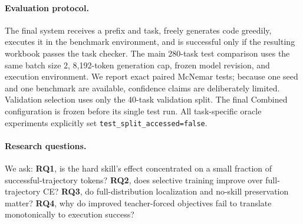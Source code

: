 \paragraph{Evaluation protocol.}
The final system receives a prefix and task, freely generates code greedily, executes it in the benchmark environment, and is successful only if the resulting workbook passes the task checker.  The main 280-task test comparison uses the same batch size 2, 8,192-token generation cap, frozen model revision, and execution environment.  We report exact paired McNemar tests; because one seed and one benchmark are available, confidence claims are deliberately limited.  Validation selection uses only the 40-task validation split.  The final Combined configuration is frozen before its single test run.  All task-specific oracle experiments explicitly set \texttt{test\_split\_accessed=false}.

\paragraph{Research questions.}
We ask: \textbf{RQ1}, is the hard skill's effect concentrated on a small fraction of successful-trajectory tokens?  \textbf{RQ2}, does selective training improve over full-trajectory CE?  \textbf{RQ3}, do full-distribution localization and no-skill preservation matter?  \textbf{RQ4}, why do improved teacher-forced objectives fail to translate monotonically to execution success?
